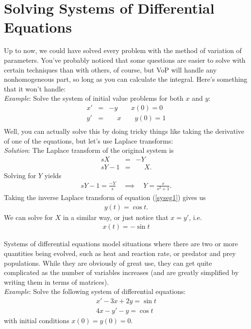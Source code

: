 \documentclass{book}
\begin{document}
\chapter{Solving Systems of Differential Equations}

Up to now, we could have solved every problem with the method of variation
of parameters. You've probably noticed that some questions are easier to
solve with certain techniques than with others, of course, but VoP will handle
any nonhomogeneous part, so long as you can calculate the integral. Here's
something that it won't handle:
\\

\noindent\emph{Example}:
Solve the system of initial value problems for both $x$ and $y$:
\begin{align*}
x' &=& -y \qquad x(0)=0 \\
y' &=& \phantom{-}x \qquad y(0)=1 \\
\end{align*}
Well, you can actually solve this by doing tricky things like taking the
derivative of one of the equations, but let's use Laplace transforms:
\\

\noindent\emph{Solution}: The Laplace transform of the original system is
\begin{align*}
sX &=& -Y \\
sY-1 &=&\phantom{-}X.
\end{align*}
Solving for $Y$ yields
\begin{align}
\label{syseg1}
sY -1 = \frac{-Y}{s} \quad \implies \quad Y = \frac{s}{s^2+1}.
\end{align}
Taking the inverse Laplace transform of equation (\ref{syseg1}) gives us
\begin{align*}
y(t) = \cos t.
\end{align*}
We can solve for $X$ in a similar way, or just notice that $x=y'$, i.e.\
\begin{align*}
x(t) = -\sin t
\end{align*}

Systems of differential equations model situations where there are two or
more quantities being evolved, such as heat and reaction rate, or predator and
prey populations. While they are obviously of great use, they can get
quite complicated as the number of variables increases (and are greatly
simplified by writing them in terms of matrices).\\


\noindent\emph{Example}: Solve the following system of differential equations:
\begin{align*}
x' - 3x + 2y = \sin t\\
4x -y' - y = \cos t
\end{align*}
with initial conditions $x(0)=y(0)=0$.
\\
\end{document}
